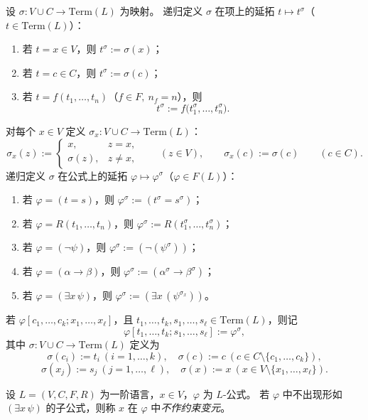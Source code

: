 \documentclass[lang=cn,a4paper,newtx,section]{elegantbook}
\begin{document}
 \begin{definition}[带常元的替换与代入记号]
 \label{substitution-with-constants}
 设 $\sigma:V\cup C\to\mathrm{Term}(L)$ 为映射。
 递归定义 $\sigma$ 在项上的延拓 $t\longmapsto t^{\sigma}$（$t\in\mathrm{Term}(L)$）：
 \begin{enumerate}
   \item 若 $t=x\in V$，则 $t^{\sigma}:=\sigma(x)$；
   \item 若 $t=c\in C$，则 $t^{\sigma}:=\sigma(c)$；
   \item 若 $t=f(t_1,\dots,t_n)$（$f\in F,\ n_f=n$），则
   \[
     t^{\sigma}:=f\bigl(t_1^{\sigma},\dots,t_n^{\sigma}\bigr).
   \]
 \end{enumerate}
 对每个 $x\in V$ 定义 $\sigma_x:V\cup C\to\mathrm{Term}(L)$：
 \[
   \sigma_x(z):=
   \begin{cases}
     x, & z=x,\\
     \sigma(z), & z\neq x,
   \end{cases}
 \qquad (z\in V),
 \qquad
 \sigma_x(c):=\sigma(c)\qquad(c\in C).
 \]
 递归定义 $\sigma$ 在公式上的延拓 $\varphi\longmapsto\varphi^{\sigma}$（$\varphi\in F(L)$）：
 \begin{enumerate}
   \item 若 $\varphi=(t=s)$，则 $\varphi^{\sigma}:=(t^{\sigma}=s^{\sigma})$；
   \item 若 $\varphi=R(t_1,\dots,t_n)$，则 $\varphi^{\sigma}:=R(t_1^{\sigma},\dots,t_n^{\sigma})$；
   \item 若 $\varphi=(\neg\psi)$，则 $\varphi^{\sigma}:=(\neg(\psi^{\sigma}))$；
   \item 若 $\varphi=(\alpha\to\beta)$，则 $\varphi^{\sigma}:=(\alpha^{\sigma}\to\beta^{\sigma})$；
   \item 若 $\varphi=(\exists x\,\psi)$，则 $\varphi^{\sigma}:=(\exists x\,(\psi^{\sigma_x}))$。
 \end{enumerate}

 若 $\varphi[c_1,\dots,c_k; x_1,\dots,x_{\ell}]$，且 $t_1,\dots,t_k,s_1,\dots,s_{\ell}\in\mathrm{Term}(L)$，则记
 \[
   \varphi[t_1,\dots,t_k; s_1,\dots,s_{\ell}]:=\varphi^{\sigma},
 \]
 其中 $\sigma:V\cup C\to\mathrm{Term}(L)$ 定义为
 \[
   \sigma(c_i):=t_i\ (i=1,\dots,k),\quad \sigma(c):=c\ (c\in C\setminus\{c_1,\dots,c_k\}),
 \]
 \[
   \sigma(x_j):=s_j\ (j=1,\dots,\ell),\quad \sigma(x):=x\ (x\in V\setminus\{x_1,\dots,x_{\ell}\}).
 \]
 \end{definition}

 \begin{definition}[不作约束变元]
 \label{not-a-bound-variable}
 设 $L=(V,C,F,R)$ 为一阶语言，$x\in V$，$\varphi$ 为 $L$-公式。
 若 $\varphi$ 中不出现形如 $(\exists x\,\psi)$ 的子公式，则称 $x$ 在 $\varphi$ 中\emph{不作约束变元}。
 \end{definition}
\end{document}
